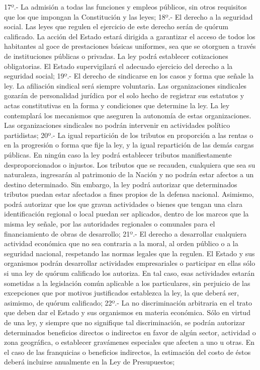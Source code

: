     17º.- La admisión a todas las funciones y empleos públicos, sin otros requisitos que los que impongan la Constitución y las leyes;
    18º.- El derecho a la seguridad social.
    Las leyes que regulen el ejercicio de este derecho serán de quórum calificado.
    La acción del Estado estará dirigida a garantizar el acceso de todos los habitantes al goce de prestaciones básicas uniformes, sea que se otorguen a través de instituciones públicas o privadas. La ley podrá establecer cotizaciones obligatorias.
    El Estado supervigilará el adecuado ejercicio del derecho a la seguridad social;
    19º.- El derecho de sindicarse en los casos y forma que señale la ley. La afiliación sindical será siempre voluntaria.
    Las organizaciones sindicales gozarán de personalidad jurídica por el solo hecho de registrar sus estatutos y actas constitutivas en la forma y condiciones que determine la ley.
    La ley contemplará los mecanismos que aseguren la autonomía de estas organizaciones. Las organizaciones sindicales no podrán intervenir en actividades político partidistas;
    20º.- La igual repartición de los tributos en proporción a las rentas o en la progresión o forma que fije la ley, y la igual repartición de las demás cargas públicas.
    En ningún caso la ley podrá establecer tributos manifiestamente desproporcionados o injustos.
    Los tributos que se recauden, cualquiera que sea su naturaleza, ingresarán al patrimonio de la Nación y no podrán estar afectos a un destino determinado.
    Sin embargo, la ley podrá autorizar que determinados tributos puedan estar afectados a fines propios de la defensa nacional. Asimismo, podrá autorizar que los que gravan actividades o bienes que tengan una clara identificación regional o local puedan ser aplicados, dentro de los marcos que la misma ley señale, por las autoridades regionales o comunales para el financiamiento de obras de desarrollo;
    21º.- El derecho a desarrollar cualquiera actividad económica que no sea contraria a la moral, al orden público o a la seguridad nacional, respetando las normas legales que la regulen.
    El Estado y sus organismos podrán desarrollar actividades empresariales o participar en ellas sólo si una ley de quórum calificado los autoriza. En tal caso, esas actividades estarán sometidas a la legislación común aplicable a los particulares, sin perjuicio de las excepciones que por motivos justificados establezca la ley, la que deberá ser, asimismo, de quórum calificado;
    22º.- La no discriminación arbitraria en el trato que deben dar el Estado y sus organismos en materia económica.
    Sólo en virtud de una ley, y siempre que no signifique tal discriminación, se podrán autorizar determinados beneficios directos o indirectos en favor de algún sector, actividad o zona geográfica, o establecer gravámenes especiales que afecten a uno u otras. En el caso de las franquicias o beneficios indirectos, la estimación del costo de éstos deberá incluirse anualmente en la Ley de Presupuestos;
